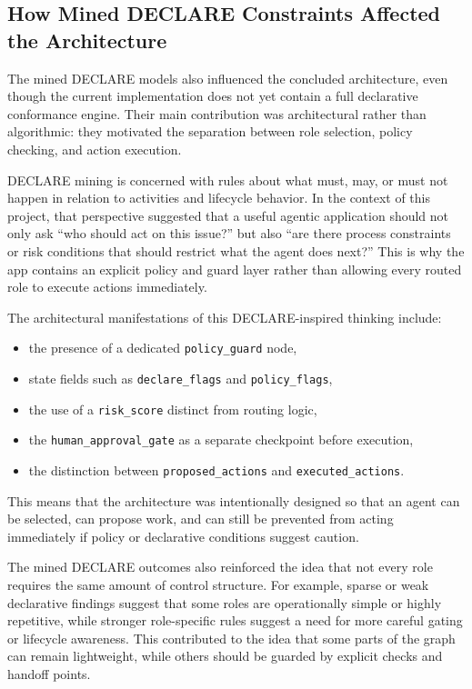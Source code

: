 \documentclass[11pt,a4paper]{article}
\begin{document}
\subsection{How Mined DECLARE Constraints Affected the Architecture}

The mined DECLARE models also influenced the concluded architecture, even though the current implementation does not yet contain a full declarative conformance engine. Their main contribution was architectural rather than algorithmic: they motivated the separation between role selection, policy checking, and action execution.

DECLARE mining is concerned with rules about what must, may, or must not happen in relation to activities and lifecycle behavior. In the context of this project, that perspective suggested that a useful agentic application should not only ask ``who should act on this issue?'' but also ``are there process constraints or risk conditions that should restrict what the agent does next?'' This is why the app contains an explicit policy and guard layer rather than allowing every routed role to execute actions immediately.

The architectural manifestations of this DECLARE-inspired thinking include:
\begin{itemize}
    \item the presence of a dedicated \texttt{policy\_guard} node,
    \item state fields such as \texttt{declare\_flags} and \texttt{policy\_flags},
    \item the use of a \texttt{risk\_score} distinct from routing logic,
    \item the \texttt{human\_approval\_gate} as a separate checkpoint before execution,
    \item the distinction between \texttt{proposed\_actions} and \texttt{executed\_actions}.
\end{itemize}

This means that the architecture was intentionally designed so that an agent can be selected, can propose work, and can still be prevented from acting immediately if policy or declarative conditions suggest caution.

The mined DECLARE outcomes also reinforced the idea that not every role requires the same amount of control structure. For example, sparse or weak declarative findings suggest that some roles are operationally simple or highly repetitive, while stronger role-specific rules suggest a need for more careful gating or lifecycle awareness. This contributed to the idea that some parts of the graph can remain lightweight, while others should be guarded by explicit checks and handoff points.
\end{document}
